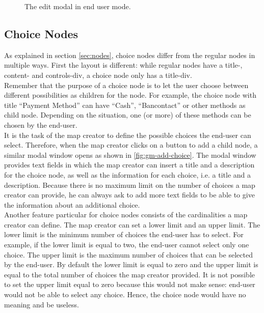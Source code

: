 \begin{figure}[H]
	\centering
	\caption{The edit modal in end user mode.}
	\label{fig:gm-editmodal-enduser}
\end{figure}





\subsection{Choice Nodes}
As explained in section \ref{sec:nodes}, choice nodes differ from the regular nodes in multiple ways. First the layout is different: while regular nodes have a title-, content- and controls-div, a choice node only has a title-div.\\

Remember that the purpose of a choice node is to let the user choose between different possibilities as children for the node. For example, the choice node with title ``Payment Method'' can have ``Cash'', ``Bancontact'' or other methods as child node. Depending on the situation, one (or more) of these methods can be chosen by the end-user.\\

It is the task of the map creator to define the possible choices the end-user can select. Therefore, when the map creator clicks on a button to add a child node, a similar modal window opens as shown in \autoref{fig:gm-add-choice}. The modal window provides text fields in which the map creator can insert a title and a description for the choice node, as well as the information for each choice, i.e. a title and a description. Because there is no maximum limit on the number of choices a map creator can provide, he can always ask to add more text fields to be able to give the information about an additional choice.\\

Another feature particular for choice nodes consists of the cardinalities a map creator can define. The map creator can set a lower limit and an upper limit. The lower limit is the minimum number of choices the end-user has to select. For example, if the lower limit is equal to two, the end-user cannot select only one choice. The upper limit is the maximum number of choices that can be selected by the end-user. By default the lower limit is equal to zero and the upper limit is equal to the total number of choices the map creator provided. It is not possible to set the upper limit equal to zero because this would not make sense: end-user would not be able to select any choice. Hence, the choice node would have no meaning and be useless.


